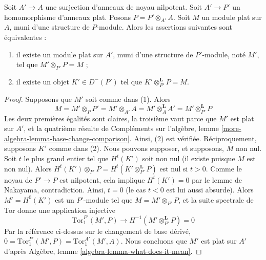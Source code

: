\begin{lemma}
\label{lemma-lift-equivalence-module-derived}
Soit $A' \to A$ une surjection d'anneaux de noyau nilpotent.
Soit $A' \to P'$ un homomorphisme d'anneaux plat.
Posons $P = P' \otimes_{A'} A$.
Soit $M$ un module plat sur $A$, muni d'une structure de $P$-module.
Alors les assertions suivantes sont équivalentes :
\begin{enumerate}
\item il existe un module plat sur $A'$, muni d'une structure de $P'$-module, noté $M'$, tel que
$M' \otimes_{P'} P = M$ ;
\item il existe un objet $K' \in D^-(P')$ tel que
$K' \otimes_{P'}^\mathbf{L} P = M$.
\end{enumerate}
\end{lemma}

\begin{proof}
Supposons que $M'$ soit comme dans (1). Alors
$$
M = M' \otimes_P P' = M' \otimes_{A'} A =
M' \otimes_A^\mathbf{L} A' = M' \otimes_{P'}^\mathbf{L} P
$$
Les deux premières égalités sont claires, la troisième vaut parce que
$M'$ est plat sur $A'$, et la quatrième résulte de
Compléments sur l'algèbre, lemme \ref{more-algebra-lemma-base-change-comparison}.
Ainsi, (2) est vérifiée. Réciproquement, supposons $K'$ comme dans (2).
Nous pouvons supposer, et supposons, $M$ non nul.
Soit $t$ le plus grand entier tel que $H^t(K')$ soit non nul
(il existe puisque $M$ est non nul).
Alors $H^t(K') \otimes_{P'} P = H^t(K' \otimes_{P'}^\mathbf{L} P)$
est nul si $t > 0$. Comme le noyau de $P' \to P$ est nilpotent,
cela implique $H^t(K') = 0$ par le lemme de Nakayama, contradiction.
Ainsi, $t = 0$ (le cas $t < 0$ est lui aussi absurde).
Alors $M' = H^0(K')$ est un $P'$-module tel que $M = M' \otimes_{P'} P$,
et la suite spectrale de Tor donne une application injective
$$
\text{Tor}_1^{P'}(M', P) \to H^{-1}(M' \otimes_{P'}^\mathbf{L} P) = 0
$$
Par la référence ci-dessus sur le changement de base dérivé,
$0 = \text{Tor}_1^{P'}(M', P) = \text{Tor}_1^{A'}(M', A)$.
Nous concluons que $M'$ est plat sur $A'$ d'après
Algèbre, lemme \ref{algebra-lemma-what-does-it-mean}.
\end{proof}

